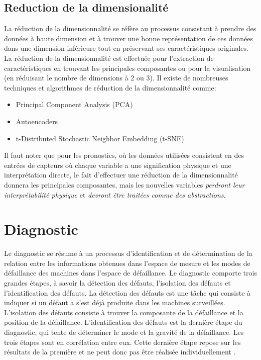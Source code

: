 \subsection{Reduction de la dimensionalité}
\label{section:dimensionality-reduction}
La réduction de la dimensionnalité se réfère au processus consistant à prendre des données à haute dimension et à trouver une bonne représentation de ces données dans une dimension inférieure tout en préservant ses caractéristiques originales. La réduction de la dimensionnalité est effectuée pour l'extraction de caractéristiques en trouvant les principales composantes ou pour la visualisation (en réduisant le nombre de dimensions à 2 ou 3).
Il existe de nombreuses techniques et algorithmes de réduction de la dimensionnalité comme:
\begin{itemize}
    \item Principal Component Analysis (PCA)
    \item Autoencoders
    \item t-Distributed Stochastic Neighbor Embedding (t-SNE)
\end{itemize}

Il faut noter que pour les pronostics, où les données utilisées consistent en des entrées de capteurs où chaque variable a une signification physique et une interprétation directe, le fait d'effectuer une réduction de la dimensionnalité donnera les principales composantes, mais les nouvelles variables \textit{perdront leur interprétabilité physique} et \textit{devront être traitées comme des abstractions}.


\section{Diagnostic}
Le diagnostic se résume à un processus d'identification et de détermination de la relation entre les informations obtenues dans l'espace de mesure et les modes de défaillance des machines dans l'espace de défaillance. Le diagnostic comporte trois grandes étapes, à savoir la détection des défauts, l'isolation des défauts et l'identification des défauts. La détection des défauts est une tâche qui consiste à indiquer si un défaut a s'est déjà produite dans les machines surveillées. L'isolation des défauts consiste à trouver la composante de la défaillance et la position de la défaillance. L'identification des défauts est la dernière étape du diagnostic, qui tente de déterminer le mode et la gravité de la défaillance. Les trois étapes sont en corrélation entre eux. Cette dernière étape repose sur les résultats de la première et ne peut donc pas être réalisée individuellement \cite{Lei2016b}.
